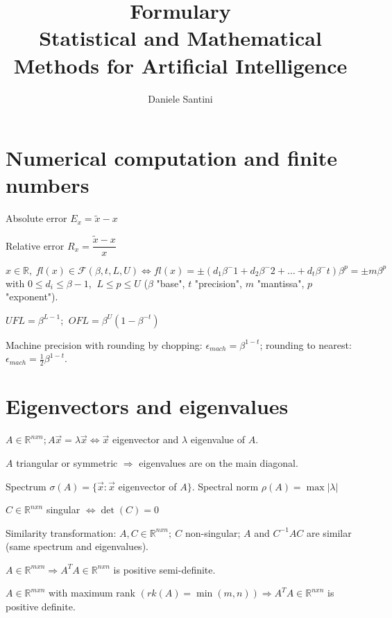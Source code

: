 \documentclass[]{article}
\title{Formulary \\ \large Statistical and Mathematical Methods for Artificial Intelligence}
\author{Daniele Santini}
\begin{document}
	
	
	\section{Numerical computation and finite numbers}
	
	Absolute error $E_x = \tilde{x} - x$
	
	Relative error $R_x = \dfrac{\tilde{x} - x}{x}$
	
	$x \in \mathbb{R}, \ fl(x) \in \mathcal{F}(\beta,t,L,U) \Leftrightarrow fl(x) = \pm (d_1 \beta^-1 + d_2 \beta^-2 + \dots + d_t \beta^-t) \beta^p = \pm m \beta^p$ with $0 \le d_i \le \beta-1$, $\ L \le p \le U$ ($\beta$ "base", $t$ "precision", $m$ "mantissa", $p$ "exponent").
	
	$UFL = \beta^{L-1}$;
	$\ OFL = \beta^U (1-\beta^{-t})$
	
	Machine precision with rounding by chopping: $\epsilon_{mach} = \beta^{1-t}$; rounding to nearest: $\epsilon_{mach} = \frac{1}{2}\beta^{1-t}$.
	
	\section{Eigenvectors and eigenvalues}
	
	$A \in \mathbb{R}^{nxn}; A \vec{x} = \lambda \vec{x} \Leftrightarrow \vec{x}$ eigenvector and $\lambda$ eigenvalue of $A$.
	
	$A$ triangular or symmetric $\Rightarrow$ eigenvalues are on the main diagonal.
	
	Spectrum $\sigma(A) = \{\vec{x}: \vec{x}$ eigenvector of $A\}$.
	Spectral norm $\rho(A) = \max \lvert \lambda \rvert$
	
	$C \in \mathbb{R}^{nxn}$ singular $\Leftrightarrow \det(C)=0$
	
	Similarity transformation: $A, C \in \mathbb{R}^{nxn}; \ C$ non-singular; $A$ and $C^{-1} A C$ are similar (same spectrum and eigenvalues).
	
	
	
	
	
	
	$A \in \mathbb{R}^{mxn} \Rightarrow A^T A \in \mathbb{R}^{nxn}$ is positive semi-definite.
	
	$A \in \mathbb{R}^{mxn}$ with maximum rank $(rk(A)=\min(m,n)) \Rightarrow A^T A \in \mathbb{R}^{nxn}$ is positive definite.
	
\end{document}
